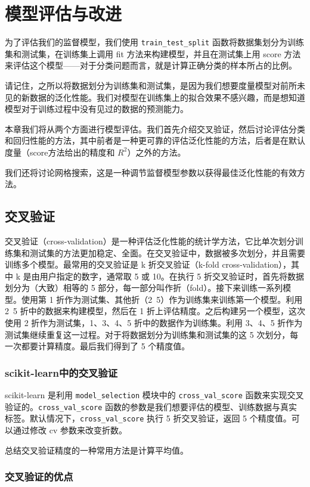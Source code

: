 \chapter{模型评估与改进}
为了评估我们的监督模型，我们使用 \verb|train_test_split| 函数将数据集划分为训练集和测试集，在训练集上调用 fit 方法来构建模型，并且在测试集上用 score 方法来评估这个模型——对于分类问题而言，就是计算正确分类的样本所占的比例。

请记住，之所以将数据划分为训练集和测试集，是因为我们想要度量模型对前所未见的新数据的泛化性能。我们对模型在训练集上的拟合效果不感兴趣，而是想知道模型对于训练过程中没有见过的数据的预测能力。

本章我们将从两个方面进行模型评估。我们首先介绍交叉验证，然后讨论评估分类和回归性能的方法，其中前者是一种更可靠的评估泛化性能的方法，后者是在默认度量（score方法给出的精度和 $R^2$）之外的方法。

我们还将讨论网格搜索，这是一种调节监督模型参数以获得最佳泛化性能的有效方法。
\section{交叉验证}
交叉验证（cross-validation）是一种评估泛化性能的统计学方法，它比单次划分训练集和测试集的方法更加稳定、全面。在交叉验证中，数据被多次划分，并且需要训练多个模型。最常用的交叉验证是 k 折交叉验证（k-fold cross-validation），其中 k 是由用户指定的数字，通常取 5 或 10。在执行 5 折交叉验证时，首先将数据划分为（大致）相等的 5 部分，每一部分叫作折（fold）。接下来训练一系列模型。使用第 1 折作为测试集、其他折（2~5）作为训练集来训练第一个模型。利用 2~5 折中的数据来构建模型，然后在 1 折上评估精度。之后构建另一个模型，这次使用 2 折作为测试集，1、3、4、5 折中的数据作为训练集。利用 3、4、5 折作为测试集继续重复这一过程。对于将数据划分为训练集和测试集的这 5 次划分，每一次都要计算精度。最后我们得到了 5 个精度值。
\subsection{scikit-learn中的交叉验证}
scikit-learn 是利用 \verb|model_selection| 模块中的 \verb|cross_val_score| 函数来实现交叉验证的。\verb|cross_val_score| 函数的参数是我们想要评估的模型、训练数据与真实标签。默认情况下，\verb|cross_val_score| 执行 5 折交叉验证，返回 5 个精度值。可以通过修改 cv 参数来改变折数。

总结交叉验证精度的一种常用方法是计算平均值。
\subsection{交叉验证的优点}

